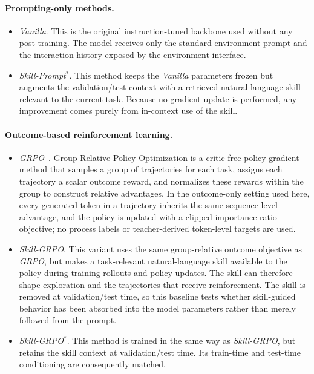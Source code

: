 \documentclass{llmxive}
\begin{document}
\paragraph{Prompting-only methods.}
\begin{itemize}
    \item \textit{Vanilla}. This is the original instruction-tuned backbone used without any post-training. The model receives only the standard environment prompt and the interaction history exposed by the environment interface. 
    \item \textit{Skill-Prompt}$^{*}$. This method keeps the \textit{Vanilla} parameters frozen but augments the validation/test context with a retrieved natural-language skill relevant to the current task. Because no gradient update is performed, any improvement comes purely from in-context use of the skill. 
\end{itemize}

\paragraph{Outcome-based reinforcement learning.}
\begin{itemize}
    \item \textit{GRPO}~\citep{shao2024deepseekmath}. Group Relative Policy Optimization is a critic-free policy-gradient method that samples a group of trajectories for each task, assigns each trajectory a scalar outcome reward, and normalizes these rewards within the group to construct relative advantages. In the outcome-only setting used here, every generated token in a trajectory inherits the same sequence-level advantage, and the policy is updated with a clipped importance-ratio objective; no process labels or teacher-derived token-level targets are used. 

    \item \textit{Skill-GRPO}. This variant uses the same group-relative outcome objective as \textit{GRPO}, but makes a task-relevant natural-language skill available to the policy during training rollouts and policy updates. The skill can therefore shape exploration and the trajectories that receive reinforcement. The skill is removed at validation/test time, so this baseline tests whether skill-guided behavior has been absorbed into the model parameters rather than merely followed from the prompt.

    \item \textit{Skill-GRPO}$^{*}$. This method is trained in the same way as \textit{Skill-GRPO}, but retains the skill context at validation/test time. Its train-time and test-time conditioning are consequently matched. 
\end{itemize}
\end{document}
